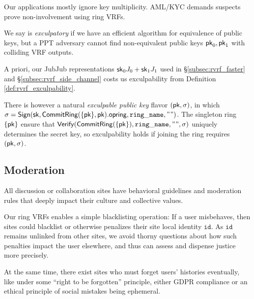 Our applications mostly ignore key multiplicity. 
AML/KYC demands suspects prove non-involvement using ring VRFs.

\begin{definition}\label{def:rvrf_exculpability}
We say \rVRF is {\em exculpatory} if we have an efficient algorithm
for equivalence of public keys, but a PPT adversary \adv cannot
find non-equivalent public keys $\mathsf{pk}_0,\mathsf{pk}_1$ with colliding VRF outputs.
\end{definition}

A priori, our JubJub representations $\mathsf{sk}_0 J_0 + \mathsf{sk}_1 J_1$
used in \S\ref{subsec:rvrf_faster} and \S\ref{subsec:rvrf_side_channel}
costs us exculpability from Definition \ref{def:rvrf_exculpability}.

There is however a natural {\em exculpable public key} flavor $(\mathsf{pk},\sigma)$,
in which
 $\sigma = {\mathsf{Sign}}(\mathsf{sk}, {\mathsf{CommitRing}}(\{ \mathsf{pk} \},\mathsf{pk}).\mathsf{opring}, \mathtt{ring\_name}, \mathtt{""})$.
The singleton ring $\{ \mathsf{pk} \}$ ensure that 
${\mathsf{Verify}}({\mathsf{CommitRing}}(\{\mathsf{pk}\}), \mathtt{ring\_name}, \mathtt{""}, \sigma)$
uniquely determines the secret key, so exculpability holds
 if joining the ring requires $(\mathsf{pk},\sigma)$.



\subsection{Moderation}
\label{subsec:moderation}

All discussion or collaboration sites have behavioral guidelines and
moderation rules that deeply impact their culture and collective values.

Our ring VRFs enables a simple blacklisting operation:
If a user misbehaves, then sites could blacklist or otherwise penalizes
their site local identity $\mathtt{id}$.
As $\mathtt{id}$ remains unlinked from other sites, we avoid thorny
questions about how such penalties impact the user elsewhere, and thus
can assess and dispense justice more precisely. 

At the same time, there exist sites who must forget users' histories
eventually, like under some ``right to be forgotten'' principle, either
GDPR compliance or an ethical principle of social mistakes being ephemeral.

